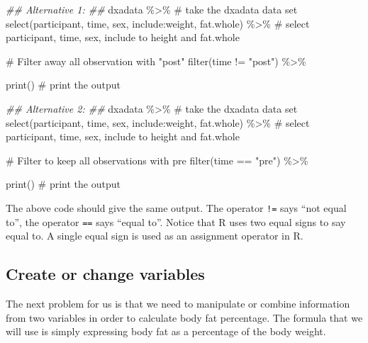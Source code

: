\documentclass[
  11pt,
  letterpaper,
]{scrbook}
\newenvironment{Shaded}{\begin{snugshade}}{\end{snugshade}}
\newcommand{\CommentTok}[1]{\textcolor[rgb]{0.37,0.37,0.37}{#1}}
\newcommand{\DocumentationTok}[1]{\textcolor[rgb]{0.37,0.37,0.37}{\textit{#1}}}
\newcommand{\FunctionTok}[1]{\textcolor[rgb]{0.28,0.35,0.67}{#1}}
\newcommand{\NormalTok}[1]{\textcolor[rgb]{0.00,0.23,0.31}{#1}}
\newcommand{\SpecialCharTok}[1]{\textcolor[rgb]{0.37,0.37,0.37}{#1}}
\newcommand{\StringTok}[1]{\textcolor[rgb]{0.13,0.47,0.30}{#1}}
\begin{document}
\begin{Shaded}
\begin{Highlighting}[numbers=left,,]
\DocumentationTok{\#\# Alternative 1: \#\#}
\NormalTok{dxadata }\SpecialCharTok{\%\textgreater{}\%} \CommentTok{\# take the dxadata data set}
  \FunctionTok{select}\NormalTok{(participant, time, sex, include}\SpecialCharTok{:}\NormalTok{weight, fat.whole) }\SpecialCharTok{\%\textgreater{}\%} 
  \CommentTok{\# select participant, time, sex, include to height and fat.whole}
  
  \CommentTok{\# Filter away all observation with "post"}
  \FunctionTok{filter}\NormalTok{(time }\SpecialCharTok{!=} \StringTok{"post"}\NormalTok{) }\SpecialCharTok{\%\textgreater{}\%}
  
  \FunctionTok{print}\NormalTok{() }\CommentTok{\# print the output}


\DocumentationTok{\#\# Alternative 2: \#\#}
\NormalTok{dxadata }\SpecialCharTok{\%\textgreater{}\%} \CommentTok{\# take the dxadata data set}
  \FunctionTok{select}\NormalTok{(participant, time, sex, include}\SpecialCharTok{:}\NormalTok{weight, fat.whole) }\SpecialCharTok{\%\textgreater{}\%} 
  \CommentTok{\# select participant, time, sex, include to height and fat.whole}
  
  \CommentTok{\# Filter to keep all observations with pre}
  \FunctionTok{filter}\NormalTok{(time }\SpecialCharTok{==} \StringTok{"pre"}\NormalTok{) }\SpecialCharTok{\%\textgreater{}\%}
  
  \FunctionTok{print}\NormalTok{() }\CommentTok{\# print the output}
\end{Highlighting}
\end{Shaded}

The above code should give the same output. The operator \texttt{!=}
says ``not equal to'', the operator \texttt{==} says ``equal to''.
Notice that R uses two equal signs to say equal to. A single equal sign
is used as an assignment operator in R.

\hypertarget{create-or-change-variables}{%
\subsection{Create or change
variables}\label{create-or-change-variables}}

The next problem for us is that we need to manipulate or combine
information from two variables in order to calculate body fat
percentage. The formula that we will use is simply expressing body fat
as a percentage of the body weight.
\end{document}
